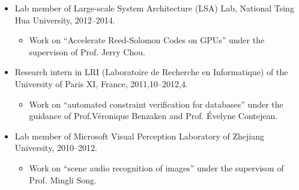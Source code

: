 \documentclass[letterpaper]{article}
\begin{document}
\begin{itemize}
\item Lab member of Large-scale System Architecture (LSA) Lab, National Tsing Hua University, 2012--2014.
    \begin{itemize}
      \item Work on ``Accelerate Reed-Solomon Codes on GPUs'' under the supervison of Prof. Jerry Chou.
    \end{itemize} 
\item Research intern in LRI (Laboratoire de Recherche en Informatique) of the University of Paris XI, France, 2011,10--2012,4.
    \begin{itemize}
	  \item Work on ``automated constraint verification for databases'' under the guidance of Prof.V\'eronique Benzaken and Prof. \'Evelyne Contejean.


    \end{itemize} 
\item Lab member of Microsoft Visual Perception Laboratory of Zhejiang University, 2010--2012.
    \begin{itemize}
	  \item Work on ``scene audio recognition of images'' under the supervison of Prof. Mingli Song. 



\end{itemize}
\end{itemize}
\end{document}
